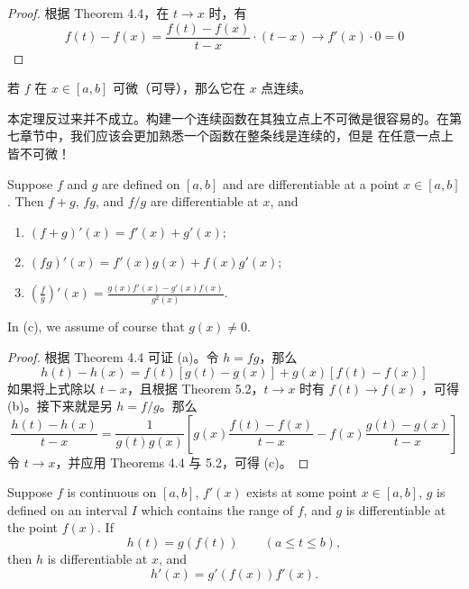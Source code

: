 \documentclass[../poma-notes.tex]{subfiles}
\begin{document}
\begin{proof}
  根据 Theorem 4.4，在 $t \to x$ 时，有
  \[
    f(t) - f(x) = \frac{f(t) - f(x)}{t - x} \cdot (t - x) \to f'(x) \cdot 0 = 0
  \]
\end{proof}

\begin{anote}
  若 $f$ 在 $x \in [a, b]$ 可微（可导），那么它在 $x$ 点连续。
\end{anote}

本定理反过来并不成立。构建一个连续函数在其独立点上不可微是很容易的。在第七章节中，我们应该会更加熟悉一个函数在整条线是连续的，但是
在任意一点上皆不可微！

\begin{theorem}
  Suppose $f$ and $g$ are defined on $[a, b]$ and are differentiable at a point $x \in [a,b]$. Then $f + g$,
  $fg$, and $f/g$ are differentiable at $x$, and
  \begin{enumerate}[label=(\alph*)]
    \item $(f+g)'(x) = f'(x) + g'(x)$;
    \item $(fg)'(x) = f'(x)g(x) + f(x)g'(x)$;
    \item $(\frac{f}{g})'(x) = \frac{g(x)f'(x) - g'(x)f(x)}{g^2(x)}$.
  \end{enumerate}
  In (c), we assume of course that $g(x) \ne 0$.
\end{theorem}

\begin{proof}\mbox{}\par
  根据 Theorem 4.4 可证 (a)。令 $h = fg$，那么
  \[
    h(t) - h(x) = f(t)[g(t) - g(x)] + g(x)[f(t) - f(x)]
  \]
  如果将上式除以 $t - x$，且根据 Theorem 5.2，$t \to x$ 时有 $f(t) \to f(x)$ ，可得 (b)。接下来就是另 $h = f/g$。那么
  \[
    \frac{h(t) - h(x)}{t - x} = \frac{1}{g(t)g(x)} [g(x)\frac{f(t)-f(x)}{t-x} - f(x)\frac{g(t)-g(x)}{t-x}]
  \]
  令 $t \to x$，并应用 Theorems 4.4 与 5.2，可得 (c)。
\end{proof}


\begin{theorem}
  Suppose $f$ is continuous on $[a, b]$, $f'(x)$ exists at some point $x \in [a, b]$, $g$ is defined on an
  interval $I$ which contains the range of $f$, and $g$ is differentiable at the point $f(x)$. If
  \[
    h(t) = g(f(t)) \qquad (a \le t \le b),
  \]
  then $h$ is differentiable at $x$, and
  \begin{equation}
    h'(x) = g'(f(x)) f'(x).
  \end{equation}
\end{theorem}
\end{document}
